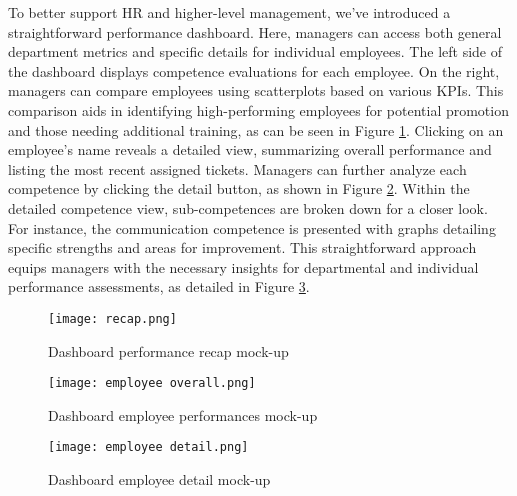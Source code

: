 To better support HR and higher-level management, we've introduced a straightforward performance dashboard. Here, managers can access both general department metrics and specific details for individual employees. The left side of the dashboard displays competence evaluations for each employee. On the right, managers can compare employees using scatterplots based on various KPIs. This comparison aids in identifying high-performing employees for potential promotion and those needing additional training, as can be seen in Figure \ref{figure:recap}. Clicking on an employee's name reveals a detailed view, summarizing overall performance and listing the most recent assigned tickets. Managers can further analyze each competence by clicking the detail button, as shown in Figure \ref{figure:employee_overall}. Within the detailed competence view, sub-competences are broken down for a closer look. For instance, the communication competence is presented with graphs detailing specific strengths and areas for improvement. This straightforward approach equips managers with the necessary insights for departmental and individual performance assessments, as detailed in Figure \ref{figure:employee_detail}.

\vfill

\begin{figure}[ht]
      \centering
      \texttt{[image: recap.png]}
      \caption{Dashboard performance recap mock-up}
      \label{figure:recap}
\end{figure}

\vfill

\begin{figure}[ht]
      \centering
      \texttt{[image: employee overall.png]}
      \caption{Dashboard employee performances mock-up}
      \label{figure:employee_overall}
\end{figure}
\begin{figure}[ht]
      \centering
      \texttt{[image: employee detail.png]}
      \caption{Dashboard employee detail mock-up}
      \label{figure:employee_detail}
\end{figure}